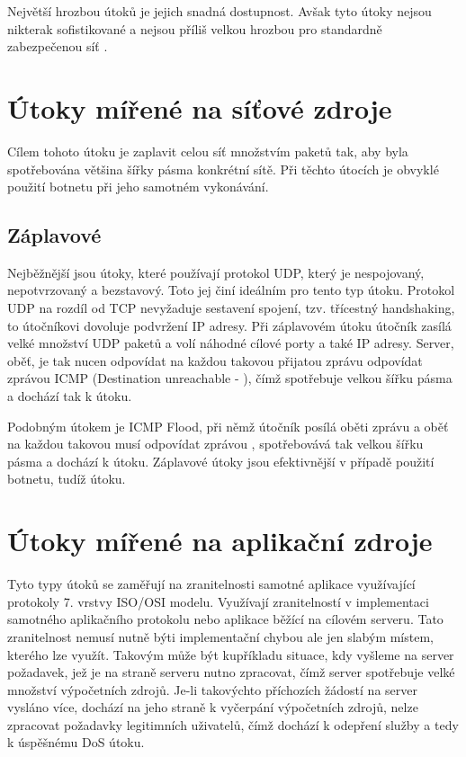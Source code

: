 Největší hrozbou  útoků je jejich snadná dostupnost. Avšak tyto útoky nejsou
nikterak sofistikované a nejsou příliš velkou hrozbou pro standardně zabezpečenou síť
\cite{DDoSaaS}.

\section{Útoky mířené na síťové zdroje}
Cílem tohoto útoku je zaplavit celou síť množstvím paketů tak, aby byla spotřebována většina
šířky pásma konkrétní sítě. Při těchto útocích je obvyklé použití botnetu při jeho samotném
vykonávání.

\subsection{Záplavové}
\label{subs_zaplavove}
Nejběžnější jsou útoky, které používají protokol UDP, který je nespojovaný, nepotvrzovaný a
bezstavový. Toto jej činí ideálním pro tento typ útoku. Protokol UDP na rozdíl od TCP
nevyžaduje sestavení spojení, tzv. třícestný handshaking, to útočníkovi dovoluje podvržení
IP adresy. Při záplavovém útoku útočník zasílá velké množství UDP paketů a volí náhodné
cílové porty a také IP adresy. Server, oběť, je tak nucen odpovídat na každou takovou
přijatou zprávu odpovídat zprávou ICMP (Destination unreachable - ),
čímž spotřebuje velkou šířku pásma a dochází tak k  útoku.


Podobným útokem je ICMP Flood, při němž útočník posílá oběti zprávu  a oběť
na každou takovou musí odpovídat zprávou , spotřebovává tak velkou šířku
pásma a dochází k  útoku.
Záplavové útoky jsou efektivnější v případě použití botnetu, tudíž  útoku.


\section{Útoky mířené na aplikační zdroje}
Tyto typy útoků se zaměřují na zranitelnosti samotné aplikace využívající protokoly 
7. vrstvy ISO/OSI modelu. Využívají zranitelností v implementaci samotného aplikačního
protokolu nebo aplikace běžící na cílovém serveru. Tato zranitelnost nemusí nutně býti
implementační chybou ale jen slabým místem, kterého lze využít. Takovým může být kupříkladu
situace, kdy vyšleme na server požadavek, jež je na straně serveru nutno zpracovat, čímž
server spotřebuje velké množství výpočetních zdrojů. Je-li takovýchto příchozích žádostí na
server vysláno více, dochází na jeho straně k vyčerpání výpočetních zdrojů, nelze zpracovat
požadavky legitimních uživatelů, čímž dochází k odepření služby a tedy k úspěšnému DoS útoku.

